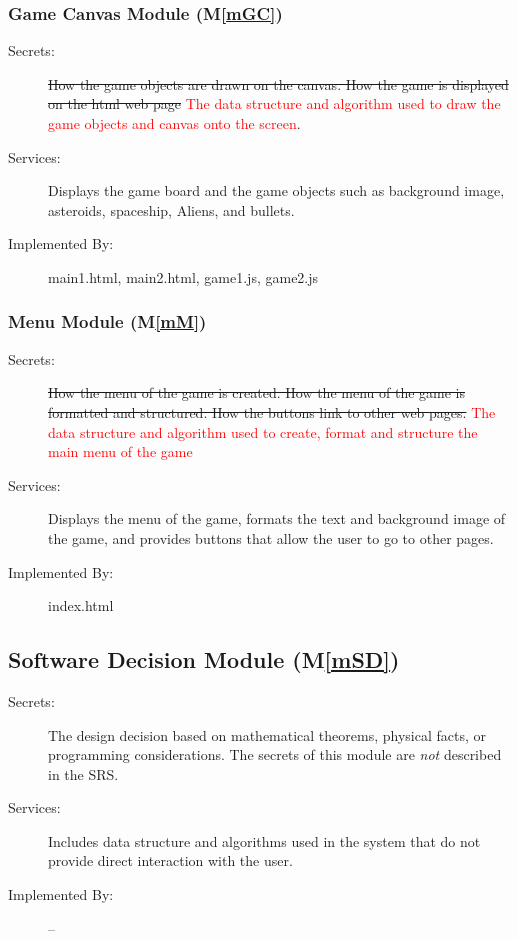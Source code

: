 \documentclass[12pt, titlepage]{article}
\newcommand{\mref}[1]{M\ref{#1}}
\begin{document}
\subsubsection{Game Canvas Module (\mref{mGC})}

\begin{description}
\item[Secrets:]\sout{How the game objects are drawn on the canvas. How the game is displayed on the html web page} \textcolor{red}{The data structure and algorithm used to draw the game objects and canvas onto the screen}.
\item[Services:]Displays the game board and the game objects such as background image, asteroids, spaceship, Aliens, and bullets.
\item[Implemented By:] main1.html, main2.html, game1.js, game2.js
\end{description}

\subsubsection{Menu Module  (\mref{mM})}

\begin{description}
\item[Secrets:]\sout{How the menu of the game is created. How the menu of the game is formatted and structured. How the buttons link to other web pages.} \textcolor{red}{The data structure and algorithm used to create, format and structure the main menu of the game}
\item[Services:]Displays the menu of the game, formats the text and background image of the game, and provides buttons that allow the user to go to other pages.
\item[Implemented By:] index.html
\end{description}

\subsection{Software Decision Module (\mref{mSD})}

\begin{description}
\item[Secrets:] The design decision based on mathematical theorems, physical
  facts, or programming considerations. The secrets of this module are
  \emph{not} described in the SRS.
\item[Services:] Includes data structure and algorithms used in the system that
  do not provide direct interaction with the user. 
\item[Implemented By:] --
\end{description}
\end{document}
